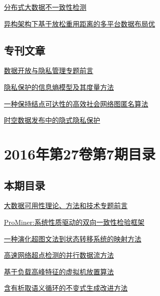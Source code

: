 \documentclass[a4paper]{article}
\begin{document}
\href{http://www.jos.org.cn/ch/reader/download_pdf.aspx?file_no=5052&year_id=2016&quarter_id=8&falg=1}{分布式大数据不一致性检测}

\href{http://www.jos.org.cn/ch/reader/download_pdf.aspx?file_no=5104&year_id=2016&quarter_id=8&falg=1}{异构架构下基于放松重用距离的多平台数据布局优}

\subsection{专刊文章}
\href{http://www.jos.org.cn/ch/reader/download_pdf.aspx?file_no=5097&year_id=2016&quarter_id=8&falg=1}{数据开放与隐私管理专题前言}

\href{http://www.jos.org.cn/ch/reader/download_pdf.aspx?file_no=5096&year_id=2016&quarter_id=8&falg=1}{隐私保护的信息熵模型及其度量方法}

\href{http://www.jos.org.cn/ch/reader/download_pdf.aspx?file_no=5092&year_id=2016&quarter_id=8&falg=1}{一种保持结点可达性的高效社会网络图匿名算法}

\href{http://www.jos.org.cn/ch/reader/download_pdf.aspx?file_no=5093&year_id=2016&quarter_id=8&falg=1}{时空数据发布中的隐式隐私保护}


\section{\textbf{2016年第27卷第7期目录}}
\subsection{本期目录}
\href{http://www.jos.org.cn/ch/reader/download_pdf.aspx?file_no=5042&year_id=2016&quarter_id=7&falg=1}{大数据可用性理论、方法和技术专题前言}

\href{http://www.jos.org.cn/ch/reader/download_pdf.aspx?file_no=4834&year_id=2016&quarter_id=7&falg=1}{ProMiner:系统性质驱动的双向一致性检验框架}

\href{http://www.jos.org.cn/ch/reader/download_pdf.aspx?file_no=4841&year_id=2016&quarter_id=7&falg=1}{一种演化超图文法到状态转移系统的映射方法}

\href{http://www.jos.org.cn/ch/reader/download_pdf.aspx?file_no=4843&year_id=2016&quarter_id=7&falg=1}{高速网络超点检测的并行数据流方法}

\href{http://www.jos.org.cn/ch/reader/download_pdf.aspx?file_no=4918&year_id=2016&quarter_id=7&falg=1}{基于负载高峰特征的虚拟机放置算法}

\href{http://www.jos.org.cn/ch/reader/download_pdf.aspx?file_no=4836&year_id=2016&quarter_id=7&falg=1}{含有析取语义循环的不变式生成改进方法}
\end{document}
